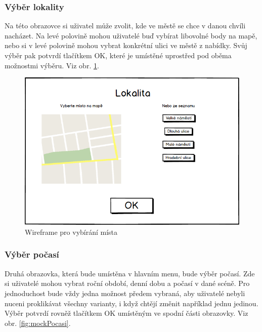 \documentclass[thesis=B,czech]{FITthesis}[2012/06/26]
\begin{document}
	\subsubsection{Výběr lokality}
Na této obrazovce si uživatel může zvolit, kde ve městě se chce v danou chvíli nacházet. Na levé polovině mohou uživatelé buď vybírat libovolné body na mapě, nebo si v levé polovině mohou vybrat konkrétní ulici ve městě z nabídky.  Svůj výběr pak potvrdí tlačítkem OK, které je umístěné uprostřed pod oběma možnostmi výběru. Viz obr. \ref{fig:mockMisto}.

	\begin{figure}
  		\includegraphics[width=\textwidth,height=\textheight,keepaspectratio]{MockMisto.png}
  		\caption{Wireframe pro vybírání místa}
  		\label{fig:mockMisto}
	\end{figure}
	
	\subsubsection{Výběr počasí}
Druhá obrazovka, která bude umístěna v hlavním menu, bude výběr počasí. Zde si uživatelé mohou vybrat roční období, denní dobu a počasí v dané scéně. Pro jednoduchost bude vždy jedna možnost předem vybraná, aby uživatelé nebyli nuceni proklikávat všechny varianty, i když chtějí změnit například jednu jedinou. Výběr potvrdí rovněž tlačítkem OK umístěným ve spodní části obrazovky. Viz obr. \ref{fig:mockPocasi}.
	
\end{document}
